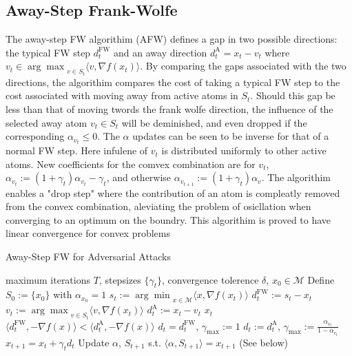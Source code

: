 \documentclass{article}
\begin{document}
\subsection{Away-Step Frank-Wolfe}
The away-step FW algorithim (AFW) defines a gap in two possible directions: the typical FW step $d_t^\text{FW}$ and an away direction $d_t^\text{A} = x_t - v_t$ where $v_t  \in {\arg \max}_{v\in S_t} \langle v, \nabla f(x_t)\rangle$. By comparing the gaps associated with the two directions, the algorithim compares the cost of taking a typical FW step to the cost associated with moving away from active atoms in $S_t$. Should this gap be less than that of moving twords the frank wolfe direction, the influence of the selected away atom $v_t\in S_t$ will be deminished, and even dropped if the corresponding $\alpha_{v_t} \leq 0$. 
The $\alpha$ updates can be seen to be inverse for that of a normal FW step. Here infulene of $v_t$ is distributed uniformly to other active atoms. New coefficients for the comvex combination are for $v_t$, $\alpha_{v_{t}} := (1+\gamma_t)\alpha_{v_t} - \gamma_t$, and otherwise $\alpha_{v_{t+1}} := (1+\gamma_t)\alpha_{v}$. 
The algorithim enables a "drop step" where the contribution of an atom is compleatly removed from the convex combination, aleviating the problem of osicllation when converging to an optimum on the boundry. 
This algorithim is proved to have linear convergence for convex problems
\begin{algorithm}[H]
\caption{Away-Step FW for Adversarial Attacks}\label{alg:cap}
\begin{algorithmic}[1]
\Require maximum iterations $T$, stepsizes $\{\gamma_t\}$, convergence tolerence $\delta$, $x_0 \in \mathcal{M}$
\State Define $S_0 := \{x_0\}$ with $\alpha_{x_0} = 1$
	\State $s_t  := {\arg \min}_{x\in\mathcal{M}} \langle x, \nabla f(x_t)\rangle$ 
	\State $d_t^{\text{FW}} := s_t - x_t$
	\State $v_t  := {\arg \max}_{v\in S_t} \langle v, \nabla f(x_t)\rangle$
	\State $d_t^{\text{A}} := x_t - v_t$
	  $x_t$ \hfill {}
	\EndIf
	\If $\langle d_t^\text{FW}, -\nabla f(x)\rangle < \langle d_t^\text{A}, -\nabla f(x)\rangle$
		\State $d_t = d_t^\text{FW}$, $\gamma_\text{max} := 1$
	\Else
		\State $d_t := d_t^\text{A}$, $\gamma_\text{max} := \frac{\alpha_{v_t}}{1- \alpha_{v_t}}$
	\EndIf
	\State $x_{t+1} = x_t + \gamma_t d_t$
	\State Update $\alpha$, $S_{t+1}$ s.t. $\langle \alpha, S_{t+1}\rangle = x_{t+1}$ (See below)
\EndFor
\end{algorithmic}
\end{algorithm}
\end{document}
